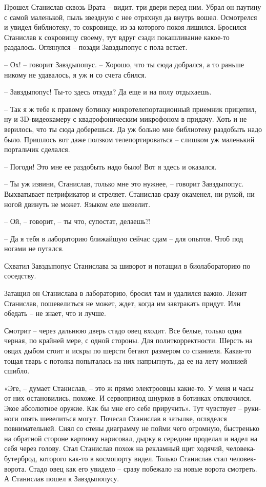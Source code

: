 \documentclass[ebook,oneside,final,openright]{memoir}
\begin{document}
\par
Прошел Станислав сквозь Врата – видит, три двери перед ним. Убрал он паутину с самой маленькой, пыль звездную с нее отряхнул да внутрь вошел. Осмотрелся и увидел библиотеку, то сокровище, из-за которого покоя лишился. Бросился Станислав к сокровищу своему, тут вдруг сзади покашливание какое-то раздалось. Оглянулся – позади Завздыпопус с пола встает.\par
– Ох! – говорит Завздыпопус. – Хорошо, что ты сюда добрался, а то раньше никому не удавалось, я уж и со счета сбился.\par
– Завздыпопус! Ты-то здесь откуда? Да еще и на полу отдыхаешь.\par
– Так я ж тебе к правому ботинку микротелепортационный приемник прицепил, ну и 3D-видеокамеру с квадрофоническим микрофоном в придачу. Хоть и не верилось, что ты сюда доберешься. Да уж больно мне библиотеку раздобыть надо было. Пришлось вот даже ползком телепортироваться – слишком уж маленький портальчик сделался.\par
– Погоди! Это мне ее раздобыть надо было! Вот я здесь и оказался.\par
– Ты уж извини, Станислав, только мне это нужнее, – говорит Завздыпопус. Выхватывает петрификатор и стреляет. Станислав сразу окаменел, ни рукой, ни ногой двинуть не может. Языком еле шевелит.\par
– Ой, – говорит, – ты что, супостат, делаешь?!\par
– Да я тебя в лабораторию ближайшую сейчас сдам – для опытов. Чтоб под ногами не путался.\par
Схватил Завздыпопус Станислава за шиворот и потащил в биолабораторию по соседству.\par
\par
Затащил он Станислава в лабораторию, бросил там и удалился важно. Лежит Станислав, пошевелиться не может, ждет, когда им завтракать придут. Или обедать – не знает, что и лучше. \par
Смотрит – через дальнюю дверь стадо овец входит. Все белые, только одна черная, по крайней мере, с одной стороны. Для политкорректности. Шерсть на овцах дыбом стоит и искры по шерсти бегают размером со спаниеля. Какая-то тощая тварь с потолка попыталась на них напрыгнуть, да ее на лету молнией сшибло.\par
\par
«Эге, – думает Станислав, – это ж прямо электроовцы какие-то. У меня и часы от них остановились, похоже. И сервопривод шнурков в ботинках отключился. Экое абсолютное оружие. Как бы мне его себе приручить». Тут чувствует – руки-ноги опять шевелиться могут. Почесал Станислав в затылке, огляделся повнимательней. Снял со стены диаграмму не пойми чего огромную, быстренько на обратной стороне картинку нарисовал, дырку в середине проделал и надел на себя через голову. Стал Станислав похож на рекламный щит ходячий, человека-бутерброд, которого как-то в космопорту видел. Только Станислав стал человек-ворота. Стадо овец как его увидело – сразу побежало на новые ворота смотреть. А Станислав пошел к Завздыпопусу.\par
\end{document}
